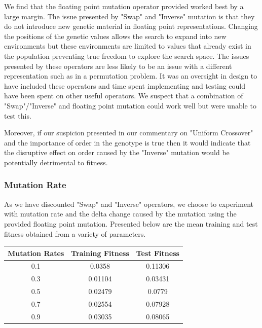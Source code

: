 \documentclass[sigconf]{acmart}
\begin{document}
We find that the floating point mutation operator provided worked best by a large margin. The issue presented by "Swap" and "Inverse" mutation is that they do not introduce new genetic material in floating point representations. Changing the positions of the genetic values allows the search to expand into new environments but these environments are limited to values that already exist in the population preventing true freedom to explore the search space. The issues presented by these operators are less likely to be an issue with a different representation such as in a permutation problem. It was an oversight in design to have included these operators and time spent implementing and testing could have been spent on other useful operators. We suspect that a combination of "Swap"/"Inverse" and floating point mutation could work well but were unable to test this.

Moreover, if our suspicion presented in our commentary on "Uniform Crossover" and the importance of order in the genotype is true then it would indicate that the disruptive effect on order caused by the "Inverse" mutation would be potentially detrimental to fitness.

\subsubsection{Mutation Rate}
As we have discounted "Swap" and "Inverse" operators, we choose to experiment with mutation rate and the delta change caused by the mutation using the provided floating point mutation. Presented below are the mean training and test fitness obtained from a variety of parameters.

\begin{center}
\begin{tabular} {|c|c|c|}
\hline
Mutation Rates& Training Fitness & Test Fitness \\
\hline
0.1 & 0.0358 & 0.11306 \\
0.3 & 0.01104 & 0.03431 \\
0.5 & 0.02479 & 0.0779 \\
0.7 & 0.02554 & 0.07928 \\
0.9 & 0.03035 & 0.08065 \\

\hline

\end{tabular}
\end{center}
\end{document}
